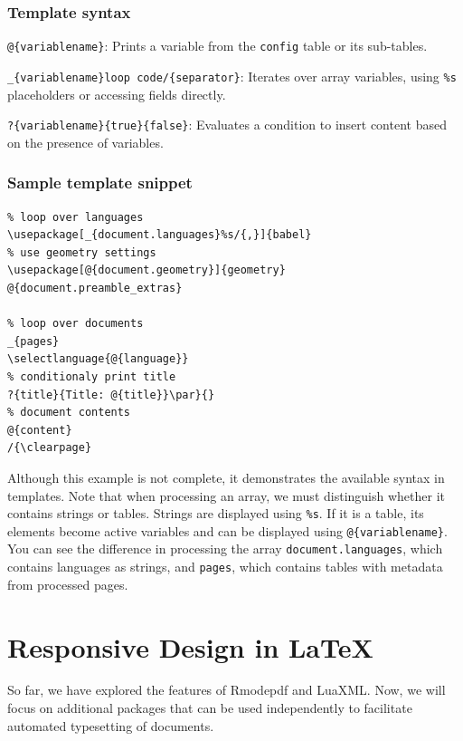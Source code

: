 \begin{frame}[fragile]
\frametitle{Template syntax}
\begin{description}
  \item[Variable Printing] \verb|@{variablename}|: Prints a variable from the \verb|config| table or its sub-tables.
  
  \item[Loops] \verb|_{variablename}loop code/{separator}|: Iterates over array variables, using \verb|%s| placeholders or accessing fields directly.
  
  \item[Conditions] \verb|?{variablename}{true}{false}|: Evaluates a condition to insert content based on the presence of variables.
\end{description}

\end{frame}

\begin{frame}[fragile]
  \frametitle{Sample template snippet}
\begin{verbatim}
% loop over languages
\usepackage[_{document.languages}%s/{,}]{babel}
% use geometry settings
\usepackage[@{document.geometry}]{geometry}
@{document.preamble_extras}

% loop over documents
_{pages}
\selectlanguage{@{language}}
% conditionaly print title
?{title}{Title: @{title}}\par}{}
% document contents
@{content}
/{\clearpage}

\end{verbatim}
\end{frame}

Although this example is not complete, it demonstrates the available syntax in templates.
Note that when processing an array, we must distinguish whether it contains
strings or tables. Strings are displayed using \verb|%s|. If it is a table, its
elements become active variables and can be displayed using
\verb|@{variablename}|. You can see the difference in processing the array
\verb|document.languages|, which contains languages as strings, and
\verb|pages|, which contains tables with metadata from processed pages.



\section{Responsive Design in \LaTeX}


So far, we have explored the features of Rmodepdf and LuaXML. Now, we will
focus on additional packages that can be used independently to facilitate
automated typesetting of documents.



